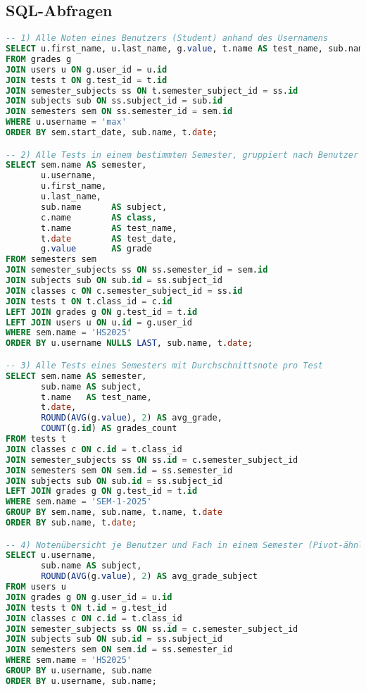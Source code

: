 \documentclass[12pt,a4paper]{article}
\begin{document}
    \subsection{SQL-Abfragen}
    \begin{lstlisting}[language=SQL]
-- 1) Alle Noten eines Benutzers (Student) anhand des Usernamens
SELECT u.first_name, u.last_name, g.value, t.name AS test_name, sub.name AS subject, sem.name AS semester
FROM grades g
JOIN users u ON g.user_id = u.id
JOIN tests t ON g.test_id = t.id
JOIN semester_subjects ss ON t.semester_subject_id = ss.id
JOIN subjects sub ON ss.subject_id = sub.id
JOIN semesters sem ON ss.semester_id = sem.id
WHERE u.username = 'max'
ORDER BY sem.start_date, sub.name, t.date;

-- 2) Alle Tests in einem bestimmten Semester, gruppiert nach Benutzer (nur Tests, Note optional)
SELECT sem.name AS semester,
       u.username,
       u.first_name,
       u.last_name,
       sub.name      AS subject,
       c.name        AS class,
       t.name        AS test_name,
       t.date        AS test_date,
       g.value       AS grade
FROM semesters sem
JOIN semester_subjects ss ON ss.semester_id = sem.id
JOIN subjects sub ON sub.id = ss.subject_id
JOIN classes c ON c.semester_subject_id = ss.id
JOIN tests t ON t.class_id = c.id
LEFT JOIN grades g ON g.test_id = t.id
LEFT JOIN users u ON u.id = g.user_id
WHERE sem.name = 'HS2025'
ORDER BY u.username NULLS LAST, sub.name, t.date;

-- 3) Alle Tests eines Semesters mit Durchschnittsnote pro Test
SELECT sem.name AS semester,
       sub.name AS subject,
       t.name   AS test_name,
       t.date,
       ROUND(AVG(g.value), 2) AS avg_grade,
       COUNT(g.id) AS grades_count
FROM tests t
JOIN classes c ON c.id = t.class_id
JOIN semester_subjects ss ON ss.id = c.semester_subject_id
JOIN semesters sem ON sem.id = ss.semester_id
JOIN subjects sub ON sub.id = ss.subject_id
LEFT JOIN grades g ON g.test_id = t.id
WHERE sem.name = 'SEM-1-2025'
GROUP BY sem.name, sub.name, t.name, t.date
ORDER BY sub.name, t.date;

-- 4) Notenübersicht je Benutzer und Fach in einem Semester (Pivot-ähnlich)
SELECT u.username,
       sub.name AS subject,
       ROUND(AVG(g.value), 2) AS avg_grade_subject
FROM users u
JOIN grades g ON g.user_id = u.id
JOIN tests t ON t.id = g.test_id
JOIN classes c ON c.id = t.class_id
JOIN semester_subjects ss ON ss.id = c.semester_subject_id
JOIN subjects sub ON sub.id = ss.subject_id
JOIN semesters sem ON sem.id = ss.semester_id
WHERE sem.name = 'HS2025'
GROUP BY u.username, sub.name
ORDER BY u.username, sub.name;


\end{lstlisting}
\end{document}
